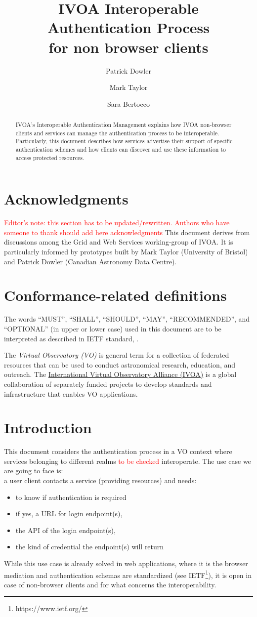 \documentclass[11pt,a4paper]{ivoa}
\title{IVOA Interoperable Authentication Process \\ for non browser clients}
\author{Patrick Dowler}
\author{Mark Taylor}
\author{Sara Bertocco}
\begin{document}
\begin{abstract}
IVOA's Interoperable Authentication Management explains how 
IVOA non-browser clients and services can manage the 
authentication process 
to be interoperable. Particularly, this document
describes how services advertise their
support of specific authentication schemes and how
clients can discover and use these information to access protected 
resources.

\end{abstract}

\section*{Acknowledgments}
\textcolor{red}{Editor's note: this section has to be 
updated/rewritten. Authors who have someone to thank should
add here acknowledgments}
This document derives from discussions among the Grid and Web Services
working-group of IVOA. It is particularly informed by prototypes built
by Mark Taylor (University of Bristol) and Patrick Dowler
(Canadian Astronomy Data Centre).



\section*{Conformance-related definitions}
The words ``MUST'', ``SHALL'', ``SHOULD'', ``MAY'', ``RECOMMENDED'', and
``OPTIONAL'' (in upper or lower case) used in this document are to be
interpreted as described in IETF standard, \citet{std:RFC2119}.

The \emph{Virtual Observatory (VO)} is
general term for a collection of federated resources that can be used
to conduct astronomical research, education, and outreach.
The \href{http://www.ivoa.net}{International
Virtual Observatory Alliance (IVOA)} is a global
collaboration of separately funded projects to develop standards and
infrastructure that enables VO applications.


\section{Introduction}
This document considers the authentication process in a VO context
where services belonging to different realms
\textcolor{red}{to be checked}
interoperate. The use 
case we are going to face is:\\
a user client contacts a service (providing resources) and needs: \begin{itemize}
    \item to know if authentication is required
    \item if yes, a URL for login endpoint(s),
    \item the API of the login endpoint(s),
    \item the kind of credential the endpoint(s) will return
\end{itemize}
While this use case is already solved in web applications,
where it is the browser mediation and authentication schemas 
are standardized (see
IETF\footnote{https://www.ietf.org/}), it is open
in case of non-browser clients and for what concerns the
interoperability.
\end{document}
